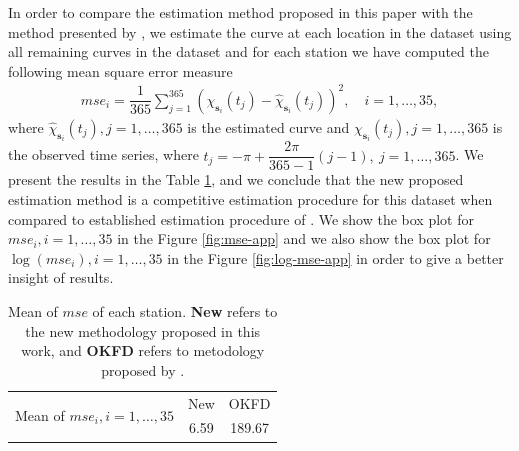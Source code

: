 \documentclass[]{interact}
\theoremstyle{plain}%
\theoremstyle{definition}
\theoremstyle{remark}
\begin{document}
In order to compare the estimation method proposed in this paper with the method presented by \cite{giraldo2011ordinary}, we estimate the curve at each location in the dataset using all remaining curves in the dataset and for each station we have computed the following mean square error measure
\begin{align*}
 mse_i = \dfrac{1}{365} \sum_{j=1}^{365} (\chi_{\bm{s}_i}(t_j) - \hat\chi_{\bm{s}_i}(t_j))^2, \quad i =1, \dots, 35,
\end{align*}
where \(\hat\chi_{\bm{s}_i}(t_j), j=1, \dots, 365\) is the estimated curve and \(\chi_{\bm{s}_i}(t_j), j=1, \dots, 365\) is the observed time series,
where \(t_j = -\pi + \dfrac{2\pi}{365-1}(j-1),\ j=1,\dots, 365\).
We present the results in the Table \ref{tab:error}, and we conclude that the new proposed estimation method is a competitive estimation procedure for this dataset when compared to established estimation procedure of
\citet{giraldo2011ordinary}. We show the box plot for \(mse_i, i=1, \dots, 35\) in the Figure \ref{fig:mse-app} and we also show the box plot for \(\log(mse_i), i=1, \dots, 35\) in the Figure \ref{fig:log-mse-app} in order to give a better insight of results.

\begin{table}[htbp]
  \centering
  \caption{Mean of $mse$ of each station. \textbf{New} refers to the new methodology proposed in this work, and \textbf{OKFD} refers to metodology proposed by \cite{giraldo2011ordinary}.}
    \begin{tabular}{lcc}
    \toprule
   \multirow{2}{*}{Mean of $mse_i, i=1,\dots, 35$} & New   & OKFD \\ \cmidrule{2-3}
    & 6.59  & 189.67 \\ \bottomrule
    \end{tabular}
  \label{tab:error}
\end{table}
\end{document}
